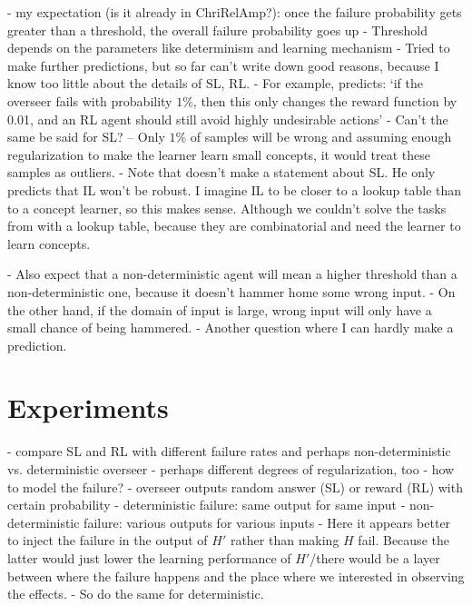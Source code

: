 \documentclass{farlamp}
\begin{document}
- my expectation (is it already in ChriRelAmp?): once the failure probability
gets greater than a threshold, the overall failure probability goes up
- Threshold depends on the parameters like determinism and learning
mechanism
- Tried to make further predictions, but so far can't write down good
reasons, because I know too little about the details of SL, RL.
- For example, \textcite{ChriRelAmp} predicts: ‘if the overseer fails with
probability $1 \%$, then this only changes the reward function by 0.01, and an
RL agent should still avoid highly undesirable actions’
- Can't the same be said for SL? – Only $1 \%$ of samples will be wrong and
assuming enough regularization to make the learner learn small concepts, it
would treat these samples as outliers.
- Note that \textcite{ChriRelAmp} doesn't make a statement about SL. He only
predicts that IL won't be robust. I imagine IL to be closer to a lookup table
than to a concept learner, so this makes sense. Although we couldn't solve the
tasks from \textcite{CSASupAmp} with a lookup table, because they are
combinatorial and need the learner to learn concepts.

- Also expect that a non-deterministic agent will mean a higher threshold than a
non-deterministic one, because it doesn't hammer home some wrong input.
- On the other hand, if the domain of input is large, wrong input will only have
a small chance of being hammered.
- Another question where I can hardly make a prediction.


\section{Experiments}

- compare SL and RL with different failure rates and perhaps
non-deterministic vs. deterministic overseer
- perhaps different degrees of regularization, too
- how to model the failure?
    - overseer outputs random answer (SL) or reward (RL) with certain
    probability
    - deterministic failure: same output for same input
    - non-deterministic failure: various outputs for various inputs
    - Here it appears better to inject the failure in the output of $H'$ rather
    than making $H$ fail. Because the latter would just lower the learning
    performance of $H'$/there would be a layer between where the failure happens
    and the place where we interested in observing the effects.
    - So do the same for deterministic.

\printbibliography
\end{document}
